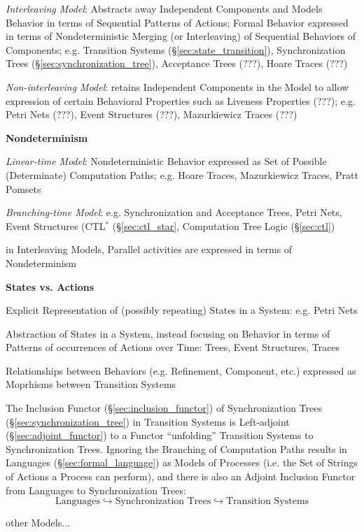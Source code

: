 \emph{Interleaving Model}: Abstracts away Independent Components and
Models Behavior in terms of Sequential Patterns of Actions; Formal
Behavior expressed in terms of Nondeterministic Merging (or
Interleaving) of Sequential Behaviors of Components; e.g. Transition
Systems (\S\ref{sec:state_transition}), Synchronization Trees
(\S\ref{sec:synchronization_tree}), Acceptance Trees (???), Hoare
Traces (???) %

\emph{Non-interleaving Model}: retains Independent Components in the
Model to allow expression of certain Behavioral Properties such as
Liveness Properties (???); e.g. Petri Nets (???), Event Structures
(???), Mazurkiewicz Traces (???)


\textbf{Nondeterminism}

\emph{Linear-time Model}: Nondeterministic Behavior expressed as Set of
Possible (Determinate) Computation Paths; e.g. Hoare Traces,
Mazurkiewicz Traces, Pratt Pomsets

\emph{Branching-time Model}: e.g. Synchronization and Acceptance
Trees, Petri Nets, Event Structures (CTL$^*$ (\S\ref{sec:ctl_star},
Computation Tree Logic (\S\ref{sec:ctl})


in Interleaving Models, Parallel activities are expressed in terms of
Nondeterminism


\textbf{States vs. Actions}

Explicit Representation of (possibly repeating) States in a System:
e.g. Petri Nets

Abstraction of States in a System, instead focusing on Behavior in
terms of Patterns of occurrences of Actions over Time: Trees, Event
Structures, Traces


Relationships between Behaviors (e.g. Refinement, Component, etc.)
expressed as Moprhisms between Transition Systems

The Inclusion Functor (\S\ref{sec:inclusion_functor}) of
Synchronization Trees (\S\ref{sec:synchronization_tree}) in Transition
Systems is Left-adjoint (\S\ref{sec:adjoint_functor}) to a Functor
``unfolding'' Transition Systems to Synchronization Trees. Ignoring
the Branching of Computation Paths results in Languages
(\S\ref{sec:formal_language}) as Models of Processes (i.e. the Set of
Strings of Actions a Process can perform), and there is also an
Adjoint Inclusion Functor from Languages to Synchronization Trees:
\[
  \text{Languages} \hookrightarrow \text{Synchronization Trees}
    \hookrightarrow \text{Transition Systems}
\]

other Models...

